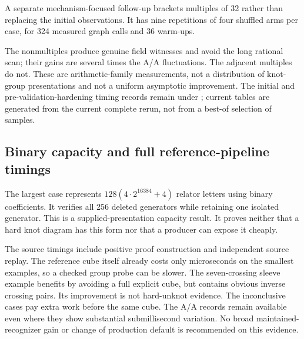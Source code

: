 \documentclass[11pt]{article}
\theoremstyle{definition}\newtheorem{definition}[theorem]{Definition}
\theoremstyle{remark}\newtheorem{remark}[theorem]{Remark}
\newcommand{\code}[1]{\texttt{#1}}
\begin{document}
A separate mechanism-focused follow-up brackets multiples of 32 rather
than replacing the initial observations. It has nine repetitions of
four shuffled arms per case, for 324 measured graph calls and 36 warm-ups.
\begin{table}[H]\centering\small

\caption{Cycle-length follow-up, recorded in \code{sieve\_followup.json}.
The ratio is paired exact/sieve time including replay. Adjacent multiples
of 32 deliberately retain the exact fallback.}
\label{tab:sieve}\end{table}
The nonmultiples produce genuine field witnesses and avoid the long
rational scan; their gains are several times the A/A fluctuations.
The adjacent multiples do not. These are arithmetic-family measurements,
not a distribution of knot-group presentations and not a uniform
asymptotic improvement. The initial and pre-validation-hardening timing
records remain under ; current tables are generated
from the current complete rerun, not from a best-of selection of samples.

\subsection{Binary capacity and full reference-pipeline timings}
\begin{table}[htbp]\centering

\caption{Binary family $P_{k,2^b}$. Each timed call constructs source rows,
checks every unit-minor proof, builds the graph and independently replays
graph deletion. Seven samples are retained per row. There is no expanded
baseline completion time assigned to the large cases.}
\label{tab:capacity}\end{table}
The largest case represents $128(4\cdot2^{16384}+4)$ relator letters using
binary coefficients. It verifies all 256 deleted generators while retaining
one isolated generator. This is a supplied-presentation capacity result.
It proves neither that a hard knot diagram has this form nor that a
producer can expose it cheaply.

\begin{table}[htbp]\centering\small

\caption{Twelve fixed small sources: the same exponential reference cube alone
versus the source-replayed probe followed, when needed, by that cube.
These are not comparisons against \code{fastunknot}.}
\label{tab:pipeline}\end{table}
The source timings include positive proof construction and independent
source replay. The reference cube itself already costs only microseconds
on the smallest examples, so a checked group probe can be slower. The
seven-crossing sleeve example benefits by avoiding a full explicit cube,
but contains obvious inverse crossing pairs. Its improvement is not
hard-unknot evidence. The inconclusive cases pay extra work before the
same cube. The A/A records remain available even where they show
substantial submillisecond variation. No broad maintained-recognizer gain
or change of production default is recommended on this evidence.
\end{document}
